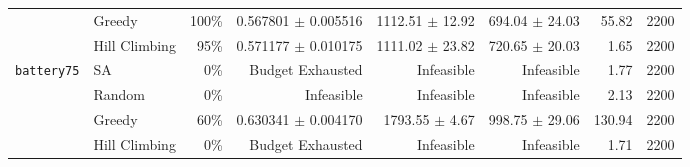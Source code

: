 \begin{table}[htbp]
{\begin{tabular}{llrrrrrr}
 & Greedy & 100\% & 0.567801 $\pm$ 0.005516 & 1112.51 $\pm$ 12.92 & 694.04 $\pm$ 24.03 & 55.82 & 2200 \\
 & Hill Climbing & 95\% & 0.571177 $\pm$ 0.010175 & 1111.02 $\pm$ 23.82 & 720.65 $\pm$ 20.03 & 1.65 & 2200 \\
\midrule
\multirow{4}{*}{\texttt{battery75}} 
 & SA & 0\% & Budget Exhausted & Infeasible & Infeasible & 1.77 & 2200 \\
 & Random & 0\% & Infeasible & Infeasible & Infeasible & 2.13 & 2200 \\
 & Greedy & 60\% & 0.630341 $\pm$ 0.004170 & 1793.55 $\pm$ 4.67 & 998.75 $\pm$ 29.06 & 130.94 & 2200 \\
 & Hill Climbing & 0\% & Budget Exhausted & Infeasible & Infeasible & 1.71 & 2200 \\
\bottomrule
\end{tabular}%
}
\end{table}

